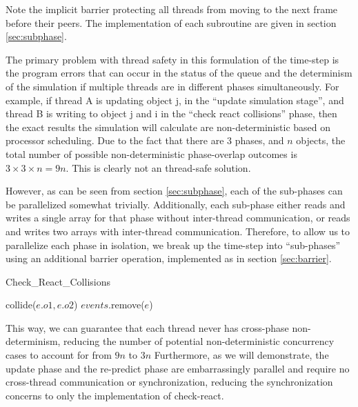 \documentclass[CEJCS,PDF]{cej} %
\begin{document}
Note the implicit barrier protecting all threads from moving to the next frame before their peers.  The implementation of each subroutine are given in section \ref{sec:subphase}.

The primary problem with thread safety in this formulation of the time-step is the program errors that can occur in the status of the queue and the determinism of the simulation
if multiple threads are in different phases simultaneously.  For example, if thread A is updating object j, in the ``update simulation stage'', and thread B is writing to object 
j and i in the ``check react collisions'' phase, then the exact results the simulation will calculate are non-deterministic based on processor scheduling.  
Due to the fact that there are 3 phases, and $n$ objects, the total number of possible non-deterministic phase-overlap outcomes is $3\times3\times n=9n$.  This is clearly not an thread-safe solution.

However, as can be seen from section \ref{sec:subphase}, each of the sub-phases can be parallelized somewhat trivially.  Additionally, each sub-phase either reads and writes
a single array for that phase without inter-thread communication, or reads and writes two arrays with inter-thread communication.  Therefore, to allow us to parallelize each
phase in isolation, we break up the time-step into ``sub-phases'' using an additional barrier operation, implemented as in section \ref{sec:barrier}.  

\begin{algorithm}
\caption{Check\_React\_Collisions}
\begin{algorithmic}
\STATE {}
	\STATE {}
		\STATE {}
		\STATE collide($e.o1,e.o2$)
	\ENDIF
	\STATE {}
	\STATE $events$.remove($e$)
\ENDFOR
\end{algorithmic}
\end{algorithm}

This way, we can guarantee that each thread never has cross-phase non-determinism, reducing the number of potential non-deterministic concurrency cases to account for from $9n$ to $3n$
Furthermore, as we will demonstrate, the update phase and the re-predict phase are embarrassingly parallel and require no cross-thread communication or synchronization,
reducing the synchronization concerns to only the implementation of check-react.
\end{document}

